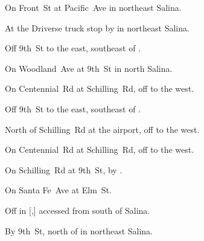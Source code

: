 

\begin{LocationList}

On Front~St at Pacific~Ave in northeast Salina.

At the Driverse truck stop by   in northeast Salina.

Off 9th~St to the east, southeast of  .

On Woodland~Ave at 9th~St in north Salina.

On Centennial~Rd at Schilling~Rd, off   to the west.

\Location{\GarageHQ \Garage}
Off 9th~St to the east, southeast of  .

North of Schilling~Rd at the airport, off   to the west.

\Location{\RecruitmentAgency \Recruitment}
On Centennial~Rd at Schilling~Rd, off   to the west.

On Schilling~Rd at 9th~St, by  .

On Santa Fe~Ave at Elm~St.

Off  in [,] accessed from  south of Salina.

By  9th~St, north of   in northeast Salina.

\end{LocationList}
